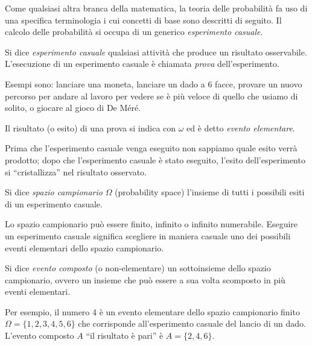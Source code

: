 Come qualsiasi altra branca della matematica, la teoria delle probabilità fa uso di una specifica terminologia i cui concetti di base sono descritti di seguito.
Il calcolo delle probabilità si occupa di un generico \emph{esperimento casuale}.
\begin{defn}
Si dice \emph{esperimento casuale} qualsiasi attività che produce un risultato osservabile. 
L'esecuzione di un esperimento casuale è chiamata \emph{prova} dell'esperimento. 
\end{defn}
Esempi sono: lanciare una moneta, lanciare un dado a 6 facce, provare un nuovo percorso per andare al lavoro per vedere se è più veloce di quello che usiamo di solito, o giocare al gioco di De Méré.
\begin{defn}
Il risultato (o esito) di una prova si indica con $\omega$ ed è detto \emph{evento elementare}.
\end{defn}
Prima che l'esperimento casuale venga eseguito non sappiamo quale esito verrà prodotto; dopo che l'esperimento casuale è stato eseguito, l'esito dell'esperimento si \enquote{cristallizza} nel risultato osservato. 
\begin{defn}
Si dice \emph{spazio campionario} $\Omega$ (probability space) l'insieme di tutti i possibili esiti di un esperimento casuale. 
\end{defn}
Lo spazio campionario può essere finito, infinito o infinito numerabile. 
Eseguire un esperimento casuale significa scegliere in maniera casuale uno dei possibili eventi elementari dello spazio campionario.
\begin{defn}
Si dice \emph{evento composto} (o non-elementare) un sottoinsieme dello spazio campionario, ovvero un insieme che può essere a sua volta scomposto in più eventi elementari.  
\end{defn}
Per esempio, il numero 4 è un evento elementare dello spazio campionario finito $\Omega = \{1, 2, 3, 4, 5, 6\}$ che corrisponde all'esperimento casuale del lancio di un dado. 
L'evento composto $A$ \enquote{il risultato è pari} è $A = \{2, 4, 6\}$. 


